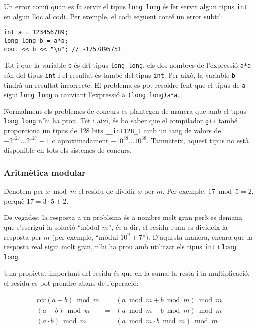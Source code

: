 Un error comú quan es fa servir el tipus \texttt{long long}
és fer servir algun tipus \texttt{int} en algun lloc
al codi.
Per exemple, el codi següent conté
un error subtil:

\begin{lstlisting}
int a = 123456789;
long long b = a*a;
cout << b << "\n"; // -1757895751
\end{lstlisting}

Tot i que la variable \texttt{b} és del tipus \texttt{long long},
els dos nombres de l'expressió \texttt{a*a}
són del tipus \texttt{int} i el resultat és
també del tipus \texttt{int}.
Per això, la variable \texttt{b} tindrà
un resultat incorrecte.
El problema es pot resoldre fent que el tipus
de \texttt{a} sigui \texttt{long long} o
canviant l'expressi\'o a \texttt{(long long)a*a}.

Normalment els problemes de concurs es plantegen de manera que
amb el tipus \texttt{long long} n'hi ha prou.
Tot i així, és bo saber que el compilador \texttt{g++} també proporciona
un tipus de 128 bits \texttt{\_\_int128\_t}
amb un rang de valors de
$-2^{127} \ldots 2^{127}-1$ o aproximadament $-10^{38} \ldots 10^{38}$.
Tanmateix, aquest tipus no està disponible en tots els sistemes de concurs.

\subsubsection{Aritmètica modular}


Denotem per $x \bmod m$ el residu
de dividir $x$ per $m$.
Per exemple, $17 \bmod 5 = 2$,
perquè $17 = 3 \cdot 5 + 2$.

De vegades, la resposta a un problema és a
nombre molt gran però es demana que s'escrigui
la soluci\'o ``mòdul $m$'', és a dir,
el residu quan es divideix la resposta per $m$
(per exemple, ``mòdul $10^9+7$'').
D'aquesta manera, encara que la resposta real
sigui molt gran,
n'hi ha prou amb utilitzar els tipus
\texttt{int} i \texttt{long long}.

Una propietat important del residu és que
en la suma, la resta i la multiplicació,
el residu es pot prendre abans de l'operació:

\[
\begin{matrix}{rcr}
(a+b) \bmod m & = & (a \bmod m + b \bmod m) \bmod m \\
(a-b) \bmod m & = & (a \bmod m - b \bmod m) \bmod m \\
(a \cdot b) \bmod m & = & (a \bmod m \cdot b \bmod m) \bmod m
\end{matrix}
\]

